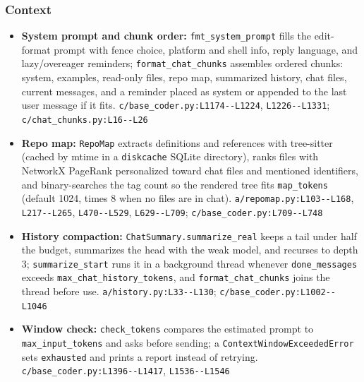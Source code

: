 \subsubsection*{Context}
\begin{itemize}
\item \textbf{System prompt and chunk order:} \texttt{fmt\_\allowbreak{}system\_\allowbreak{}prompt} fills the edit-format prompt with fence choice, platform and shell info, reply language, and lazy/overeager reminders; \texttt{format\_\allowbreak{}chat\_\allowbreak{}chunks} assembles ordered chunks: system, examples, read-only files, repo map, summarized history, chat files, current messages, and a reminder placed as system or appended to the last user message if it fits. \texttt{c/\allowbreak{}base\_\allowbreak{}coder.\allowbreak{}py:\allowbreak{}L1174-\allowbreak{}-\allowbreak{}L1224}, \texttt{L1226-\allowbreak{}-\allowbreak{}L1331}; \texttt{c/\allowbreak{}chat\_\allowbreak{}chunks.\allowbreak{}py:\allowbreak{}L16-\allowbreak{}-\allowbreak{}L26}
\item \textbf{Repo map:} \texttt{RepoMap} extracts definitions and references with tree-sitter (cached by mtime in a \texttt{diskcache} SQLite directory), ranks files with NetworkX PageRank personalized toward chat files and mentioned identifiers, and binary-searches the tag count so the rendered tree fits \texttt{map\_\allowbreak{}tokens} (default 1024, times 8 when no files are in chat). \texttt{a/\allowbreak{}repomap.\allowbreak{}py:\allowbreak{}L103-\allowbreak{}-\allowbreak{}L168}, \texttt{L217-\allowbreak{}-\allowbreak{}L265}, \texttt{L470-\allowbreak{}-\allowbreak{}L529}, \texttt{L629-\allowbreak{}-\allowbreak{}L709}; \texttt{c/\allowbreak{}base\_\allowbreak{}coder.\allowbreak{}py:\allowbreak{}L709-\allowbreak{}-\allowbreak{}L748}
\item \textbf{History compaction:} \texttt{ChatSummary.\allowbreak{}summarize\_\allowbreak{}real} keeps a tail under half the budget, summarizes the head with the weak model, and recurses to depth 3; \texttt{summarize\_\allowbreak{}start} runs it in a background thread whenever \texttt{done\_\allowbreak{}messages} exceeds \texttt{max\_\allowbreak{}chat\_\allowbreak{}history\_\allowbreak{}tokens}, and \texttt{format\_\allowbreak{}chat\_\allowbreak{}chunks} joins the thread before use. \texttt{a/\allowbreak{}history.\allowbreak{}py:\allowbreak{}L33-\allowbreak{}-\allowbreak{}L130}; \texttt{c/\allowbreak{}base\_\allowbreak{}coder.\allowbreak{}py:\allowbreak{}L1002-\allowbreak{}-\allowbreak{}L1046}
\item \textbf{Window check:} \texttt{check\_\allowbreak{}tokens} compares the estimated prompt to \texttt{max\_\allowbreak{}input\_\allowbreak{}tokens} and asks before sending; a \texttt{ContextWindowExceededError} sets \texttt{exhausted} and prints a report instead of retrying. \texttt{c/\allowbreak{}base\_\allowbreak{}coder.\allowbreak{}py:\allowbreak{}L1396-\allowbreak{}-\allowbreak{}L1417}, \texttt{L1536-\allowbreak{}-\allowbreak{}L1546}

\end{itemize}
